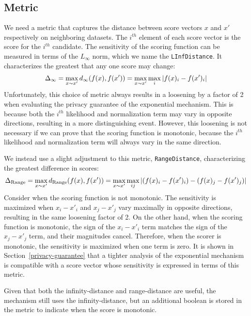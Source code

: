 \documentclass{article}
\begin{document}
 
\subsection{Metric} 
We need a metric that captures the distance between score vectors $x$ and $x'$ respectively on neighboring datasets.  
The $i^{th}$ element of each score vector is the score for the $i^{th}$ candidate. 
The sensitivity of the scoring function can be measured in terms of the $L_\infty$ norm, which we name the \texttt{LInfDistance}.  
It characterizes the greatest that any one score may change: 
\begin{equation} 
    \Delta_{\infty} = \max_{x \sim x'} d_{\infty}(f(x), f(x')) = \max_{x \sim x'} \max_i \abs{f(x)_i - f(x')_i} 
\end{equation} 
Unfortunately, this choice of metric always results in a loosening by a factor of 2 when evaluating the privacy guarantee of the exponential mechanism. 
This is because both the $i^{th}$ likelihood and normalization term may vary in opposite directions, resulting in a more distinguishing event. 
However, this loosening is not necessary if we can prove that the scoring function is monotonic, because the $i^{th}$ likelihood and normalization term will always vary in the same direction. 
 
We instead use a slight adjustment to this metric, \texttt{RangeDistance}, characterizing the greatest difference in scores: 
\begin{equation} 
    \Delta_{\text{Range}} = \max_{x \sim x'} d_{\text{Range}}(f(x), f(x')) = \max_{x \sim x'} \max_{ij} \abs{(f(x)_i - f(x')_i) - (f(x)_j - f(x')_j)} 
\end{equation} 
Consider when the scoring function is not monotonic. 
The sensitivity is maximized when $x_i - x'_i$ and $x_j - x'_j$ vary maximally in opposite directions, resulting in the same loosening factor of 2. 
On the other hand, when the scoring function is monotonic, the sign of the $x_i - x'_i$ term matches the sign of the $x_j - x'_j$ term, 
and their magnitudes cancel. 
Therefore, when the scorer is monotonic, the sensitivity is maximized when one term is zero.  
It is shown in Section~\ref{privacy-guarantee} that a tighter analysis of the exponential mechanism is compatible with a score vector whose sensitivity is expressed in terms of this metric. 
 
Given that both the infinity-distance and range-distance are useful, the mechanism still uses the infinity-distance, 
but an additional boolean is stored in the metric to indicate when the score is monotonic. 
 
\end{document}
